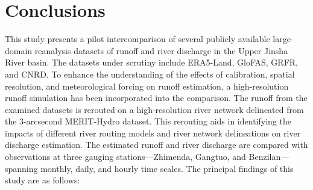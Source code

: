 \documentclass[water,article,submit,pdftex,moreauthors]{Definitions/mdpi}
\begin{document}
\section{Conclusions}

This study presents a pilot intercomparison of several publicly available large-domain reanalysis datasets of runoff and river discharge in the Upper Jinsha River basin. The datasets under scrutiny include ERA5-Land, GloFAS, GRFR, and CNRD. To enhance the understanding of the effects of calibration, spatial resolution, and meteorological forcing on runoff estimation, a high-resolution runoff simulation has been incorporated into the comparison. The runoff from the examined datasets is rerouted on a high-resolution river network delineated from the 3-arcsecond MERIT-Hydro dataset. This rerouting aids in identifying the impacts of different river routing models and river network delineations on river discharge estimation. The estimated runoff and river discharge are compared with observations at three gauging stations—Zhimenda, Gangtuo, and Benzilan—spanning monthly, daily, and hourly time scales. The principal findings of this study are as follows:
\end{document}
